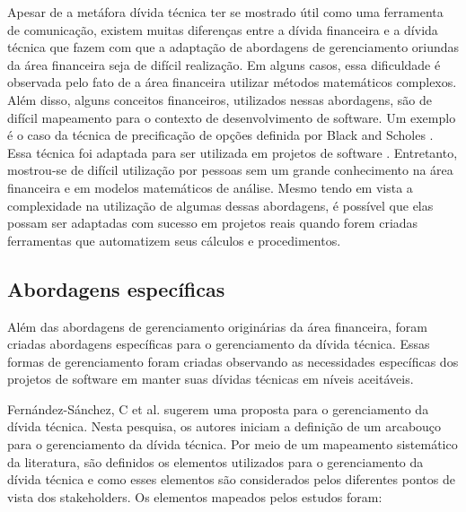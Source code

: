 Apesar de a metáfora dívida técnica ter se mostrado útil como uma ferramenta de comunicação, existem muitas diferenças entre a dívida financeira e a dívida técnica que fazem com que a adaptação de abordagens de gerenciamento oriundas da área financeira seja de difícil realização. Em alguns casos, essa dificuldade é observada pelo fato de a área financeira utilizar métodos matemáticos complexos. Além disso, alguns conceitos financeiros, utilizados nessas abordagens, são de difícil mapeamento para o contexto de desenvolvimento de software. Um exemplo é o caso da técnica de precificação de opções definida por Black and Scholes \cite{chriss1996black}.  Essa técnica foi adaptada para ser utilizada em projetos de software \cite{benaroch1999case,alzaghoul2013cloudmtd,abad2015using}. Entretanto, mostrou-se de difícil utilização por pessoas sem um grande conhecimento na área financeira e em modelos matemáticos de análise. Mesmo tendo em vista a complexidade na utilização de algumas dessas abordagens, é possível que elas possam ser adaptadas com sucesso em projetos reais quando forem criadas ferramentas que automatizem seus cálculos e procedimentos. 


\subsection{Abordagens específicas}


Além das abordagens de gerenciamento originárias da área financeira, foram criadas abordagens  específicas para o gerenciamento da dívida técnica. Essas formas de gerenciamento foram criadas observando as necessidades específicas dos projetos de software em manter suas dívidas técnicas em níveis aceitáveis.



 Fernández-Sánchez, C et al.\cite{fernandez2015framework} sugerem uma proposta para o gerenciamento da dívida técnica. Nesta pesquisa, os autores iniciam a definição de um arcabouço para o gerenciamento da dívida técnica. Por meio de um mapeamento sistemático da literatura, são definidos os elementos utilizados para o gerenciamento da dívida técnica e como esses elementos são considerados pelos diferentes pontos de vista dos stakeholders. Os elementos mapeados pelos estudos foram:

